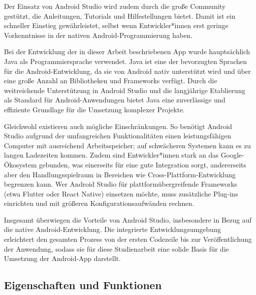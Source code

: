 \documentclass[a4paper, 12pt]{article} %
\begin{document}
\begin{spacing}{1.8}
Der Einsatz von Android Studio wird zudem durch die große Community gestützt, die Anleitungen, Tutorials und Hilfestellungen bietet. 
Damit ist ein schneller Einstieg gewährleistet, selbst wenn Entwickler*innen erst geringe Vorkenntnisse in der nativen Android-Programmierung haben.

Bei der Entwicklung der in dieser Arbeit beschriebenen App wurde hauptsächlich Java als Programmiersprache verwendet. Java ist eine der 
bevorzugten Sprachen für die Android-Entwicklung, da sie von Android nativ unterstützt wird und über eine große Anzahl an Bibliotheken und 
Frameworks verfügt. Durch die weitreichende Unterstützung in Android Studio und die langjährige Etablierung als Standard für Android-Anwendungen 
bietet Java eine zuverlässige und effiziente Grundlage für die Umsetzung komplexer Projekte.

Gleichwohl existieren auch mögliche Einschränkungen. So benötigt Android Studio aufgrund der umfangreichen Funktionalitäten einen 
leistungsfähigen Computer mit ausreichend Arbeitsspeicher; auf schwächeren Systemen kann es zu langen Ladezeiten kommen. Zudem sind 
Entwickler*innen stark an das Google-Ökosystem gebunden, was einerseits für eine gute Integration sorgt, andererseits aber den Handlungsspielraum 
in Bereichen wie Cross-Plattform-Entwicklung begrenzen kann. Wer Android Studio für plattformübergreifende Frameworks (etwa Flutter oder React Native) 
einsetzen möchte, muss zusätzliche Plug-ins einrichten und mit größeren Konfigurationsaufwänden rechnen.

Insgesamt überwiegen die Vorteile von Android Studio, insbesondere in Bezug auf die native Android-Entwicklung. 
Die integrierte Entwicklungsumgebung erleichtert den gesamten Prozess von der ersten Codezeile bis zur Veröffentlichung der 
Anwendung, sodass sie für diese Studienarbeit eine solide Basis für die Umsetzung der Android-App darstellt.
\end{spacing}


\clearpage

\subsection{Eigenschaften und Funktionen}
\end{document}
